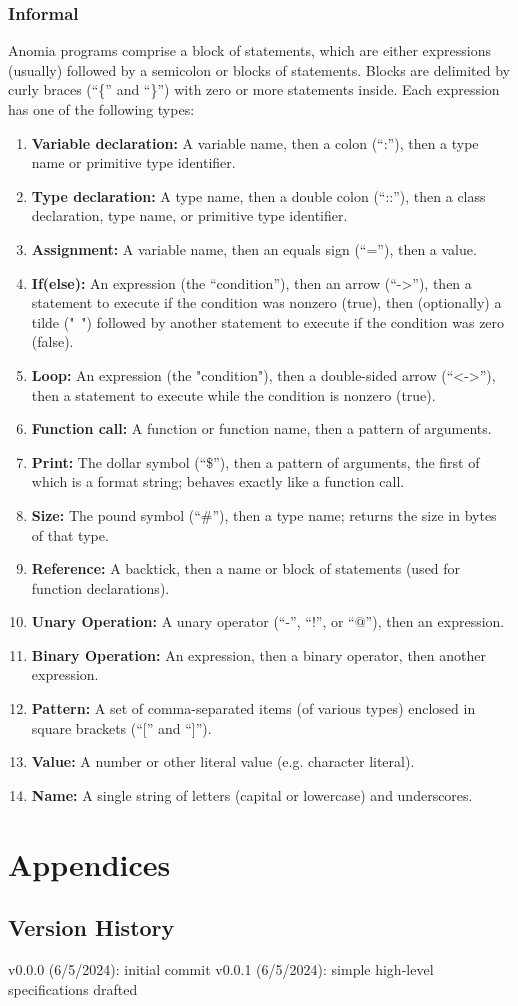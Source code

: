 \documentclass[12pt,letterpaper]{article}
\begin{document}
\subsubsection[1]{Informal}
Anomia programs comprise a block of statements, which are either expressions (usually) followed by a semicolon or blocks of statements. Blocks are delimited by curly braces (``\{'' and ``\}'') with zero or more statements inside. Each expression has one of the following types:
\begin{enumerate}[]
  \item \textbf{Variable declaration:} A variable name, then a colon (``:''), then a type name or primitive type identifier.
  \item \textbf{Type declaration:} A type name, then a double colon (``::''), then a class declaration, type name, or primitive type identifier.
  \item \textbf{Assignment:} A variable name, then an equals sign (``=''), then a value.
  \item \textbf{If(else):} An expression (the ``condition''), then an arrow (``-\textgreater''), then a statement to execute if the condition was nonzero (true), then (optionally) a tilde ("~") followed by another statement to execute if the condition was zero (false).
  \item \textbf{Loop:} An expression (the "condition"), then a double-sided arrow (``\textless-\textgreater''), then a statement to execute while the condition is nonzero (true).
  \item \textbf{Function call:} A function or function name, then a pattern of arguments.
  \item \textbf{Print:} The dollar symbol (``\$''), then a pattern of arguments, the first of which is a format string; behaves exactly like a function call.
  \item \textbf{Size:} The pound symbol (``\#''), then a type name; returns the size in bytes of that type.
  \item \textbf{Reference:} A backtick, then a name or block of statements (used for function declarations).
  \item \textbf{Unary Operation:} A unary operator (``-'', ``!'', or ``@''), then an expression.
  \item \textbf{Binary Operation:} An expression, then a binary operator, then another expression.
  \item \textbf{Pattern:} A set of comma-separated items (of various types) enclosed in square brackets (``['' and ``]'').
  \item \textbf{Value:} A number or other literal value (e.g. character literal).
  \item \textbf{Name:} A single string of letters (capital or lowercase) and underscores.
\end{enumerate}

\section[2]{Appendices}

\subsection[0]{Version History}
v0.0.0 (6/5/2024): initial commit \newline
v0.0.1 (6/5/2024): simple high-level specifications drafted
\end{document}
